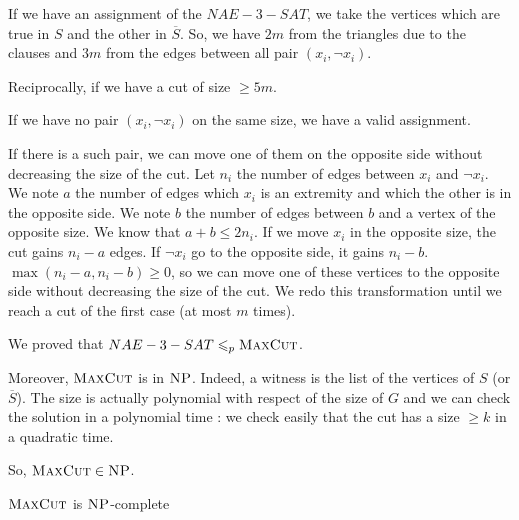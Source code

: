 If we have an assignment of the $NAE-3-SAT$, we take the vertices which are true in $S$ and the other in $\overline{S}$. So, we have $2m$ from the triangles due to the clauses and $3m$ from the edges between all pair $(x_i,\neg x_i)$.

Reciprocally, if we have a cut of size $\geqslant 5m$.

If we have no pair $(x_i, \neg x_i)$ on the same size, we have a valid assignment.

If there is a such pair, we can move one of them on the opposite side without decreasing the size of the cut. Let $n_i$ the number of edges between $x_i$ and $\neg x_i$. We note $a$ the number of edges which $x_i$ is an extremity and which the other is in the opposite side. We note $b$ the number of edges between $b$ and a vertex of the opposite size. We know that $a+b \leqslant 2n_i$. If we move $x_i$ in the opposite size, the cut gains $n_i-a$ edges. If $\neg x_i$ go to the opposite side, it gains $n_i-b$. $\max(n_i-a,n_i-b)\geqslant 0$, so we can move one of these vertices to the opposite side without decreasing the size of the cut. We redo this transformation until we reach a cut of the first case (at most $m$ times).

We proved that $NAE-3-SAT \leqslant_p \textsc{MaxCut}$.

Moreover, $\textsc{MaxCut}$ is in $\textsc{NP}$. Indeed, a witness is the list of the vertices of $S$ (or $\overline{S}$). The size is actually polynomial with respect of the size of $G$ and we can check the solution in a polynomial time : we check easily that the cut has a size $\geqslant k$ in a quadratic time.

So, $\textsc{MaxCut}\in\textsc{NP}$.

\begin{theorem}
    $\textsc{MaxCut}$ is $\textsc{NP}$-complete
\end{theorem}
   

